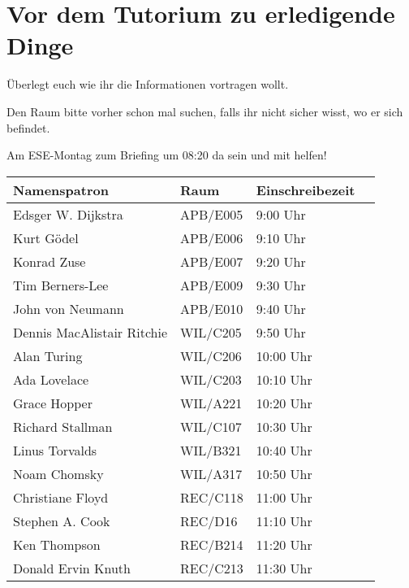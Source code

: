 \documentclass[a4paper,12pt]{report}
\begin{document}
\section{Vor dem Tutorium zu erledigende Dinge}
\begin{itemize*}
\item Überlegt euch wie ihr die Informationen vortragen wollt.
\item Den Raum bitte vorher schon mal suchen, falls ihr nicht sicher wisst, wo er sich befindet.
\item Am ESE-Montag zum Briefing um 08:20 da sein und mit helfen!
\end{itemize*}

\begin{center}
\vspace{1cm}
\begin{tabular}[h]{|l|l|l|l|}
    \hline
    \textbf{Namenspatron}       & \textbf{Raum} & \textbf{Einschreibezeit}\\ \hline
    Edsger W. Dijkstra          & APB/E005      & 9:00 Uhr\\
    Kurt Gödel                  & APB/E006      & 9:10 Uhr\\
    Konrad Zuse                 & APB/E007      & 9:20 Uhr\\
    Tim Berners-Lee             & APB/E009      & 9:30 Uhr\\
    John von Neumann            & APB/E010      & 9:40 Uhr\\
    Dennis MacAlistair Ritchie  & WIL/C205      & 9:50 Uhr\\
    Alan Turing                 & WIL/C206      & 10:00 Uhr\\
    Ada Lovelace                & WIL/C203      & 10:10 Uhr\\
    Grace Hopper                & WIL/A221      & 10:20 Uhr\\
    Richard Stallman            & WIL/C107      & 10:30 Uhr\\
    Linus Torvalds              & WIL/B321      & 10:40 Uhr\\
    Noam Chomsky                & WIL/A317      & 10:50 Uhr\\
    Christiane Floyd            & REC/C118      & 11:00 Uhr\\
    Stephen A. Cook             & REC/D16       & 11:10 Uhr\\
    Ken Thompson                & REC/B214      & 11:20 Uhr\\
    Donald Ervin Knuth          & REC/C213      & 11:30 Uhr\\
    \hline
\end{tabular}
\end{center}
\end{document}
